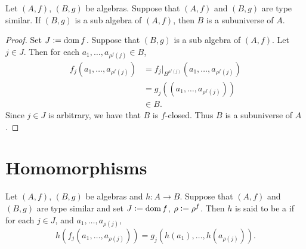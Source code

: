 \documentclass{book}
\begin{document}
	\begin{ex}
		Let $(A, f)$, $(B, g)$ be algebras. Suppose that $(A, f)$ and $(B, g)$ are type similar. If $(B, g)$ is a sub algebra of $(A, f)$, then $B$ is a subuniverse of $A$. 
	\end{ex}

	\begin{proof}
		Set $J \vcentcolon= \operatorname{dom} f$. Suppose that $(B, g)$ is a sub algebra of $(A, f)$. Let $j \in J$. Then for each $a_1, \ldots, a_{\rho^f(j)} \in B$, 
		\begin{align*}
			f_j(a_1, \ldots, a_{\rho^f(j)})
			& = f_j|_{B^{\rho^f(j)}}(a_1, \ldots, a_{\rho^f(j)}) \\
			& = g_j((a_1, \ldots, a_{\rho^f(j)})) \\
			& \in B.
		\end{align*}
		Since $j \in J$ is arbitrary, we have that $B$ is $f$-closed. Thus $B$ is a subuniverse of $A$.
	\end{proof}

	



	
	
	
	
	
	
	
	
	
	
	
	
	
	
	
	
	
	
	
	
	
	
	
	
	
	
	
	
	
	
	
	
	
	
	
	
	
	\newpage
	
	\section{Homomorphisms}
	
	\begin{defn}
		Let $(A, f)$, $(B, g)$ be algebras and $h:A \rightarrow B$. Suppose that $(A, f)$ and $(B, g)$ are type similar and set $J \vcentcolon= \operatorname{dom} f$, $\rho \vcentcolon= \rho^f$. Then $h$ is said to be a  if for each $j \in J$, and $a_1, \ldots, a_{\rho(j)}$, 
		$$h(f_j(a_1, \ldots, a_{\rho(j)})) = g_j(h(a_1), \ldots, h(a_{\rho(j)})).$$
	\end{defn}
	
\end{document}
